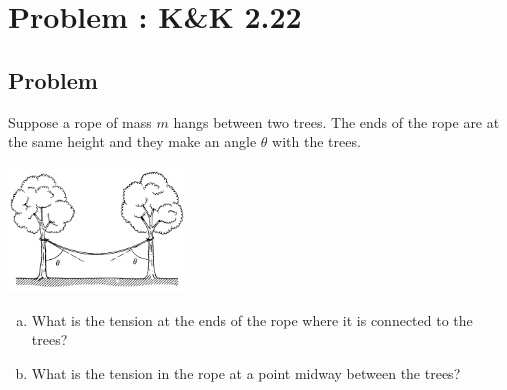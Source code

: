 \documentclass[solutions]{esg8012pset}
\begin{document}
\section{Problem \thesection: K\&K 2.22}
\subsection{Problem}
  Suppose a rope of mass $m$ hangs between two trees. The ends of the rope are at the same height and they make an angle $\theta$ with the trees.
  \begin{center}\includegraphics[width=0.35\textwidth]{ps02_5}\end{center}
  \begin{enumerate}[a)]
    \item What is the tension at the ends of the rope where it is connected to the trees?
    \item What is the tension in the rope at a point midway between the trees?
  \end{enumerate}
\end{document}
